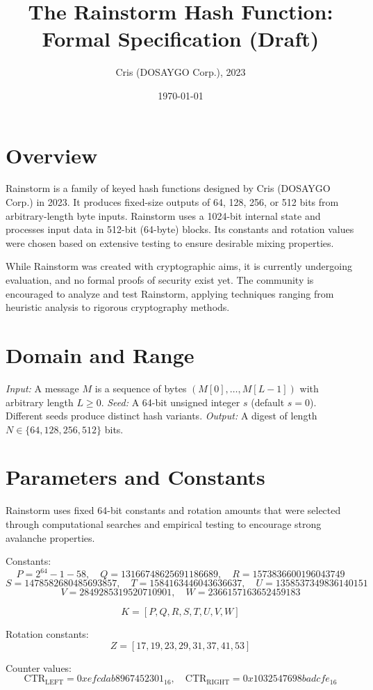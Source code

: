 \documentclass[11pt,a4paper]{article}
\title{The Rainstorm Hash Function: Formal Specification (Draft)}
\author{Cris (DOSAYGO Corp.), 2023}
\date{\today}
\begin{document}
\maketitle

\section*{Overview}
Rainstorm is a family of keyed hash functions designed by Cris (DOSAYGO Corp.) in 2023. It produces fixed-size outputs of 64, 128, 256, or 512 bits from arbitrary-length byte inputs. Rainstorm uses a 1024-bit internal state and processes input data in 512-bit (64-byte) blocks. Its constants and rotation values were chosen based on extensive testing to ensure desirable mixing properties.

While Rainstorm was created with cryptographic aims, it is currently undergoing evaluation, and no formal proofs of security exist yet. The community is encouraged to analyze and test Rainstorm, applying techniques ranging from heuristic analysis to rigorous cryptography methods.

\section*{Domain and Range}
\textit{Input:} A message $M$ is a sequence of bytes $(M[0], \ldots, M[L-1])$ with arbitrary length $L \ge 0$.  
\textit{Seed:} A 64-bit unsigned integer $s$ (default $s=0$). Different seeds produce distinct hash variants.  
\textit{Output:} A digest of length $N \in \{64, 128, 256, 512\}$ bits.

\section*{Parameters and Constants}
Rainstorm uses fixed 64-bit constants and rotation amounts that were selected through computational searches and empirical testing to encourage strong avalanche properties.

Constants:
\[
P = 2^{64}-1 - 58, \quad Q = 13166748625691186689, \quad R = 1573836600196043749
\]
\[
S = 1478582680485693857, \quad T = 1584163446043636637, \quad U = 1358537349836140151
\]
\[
V = 2849285319520710901, \quad W = 2366157163652459183
\]

\[
K = [P, Q, R, S, T, U, V, W]
\]

Rotation constants:
\[
Z = [17, 19, 23, 29, 31, 37, 41, 53]
\]

Counter values:
\[
\text{CTR}_{\text{LEFT}} = 0xefcdab8967452301_{16}, \quad
\text{CTR}_{\text{RIGHT}} = 0x1032547698badcfe_{16}
\]
\end{document}
